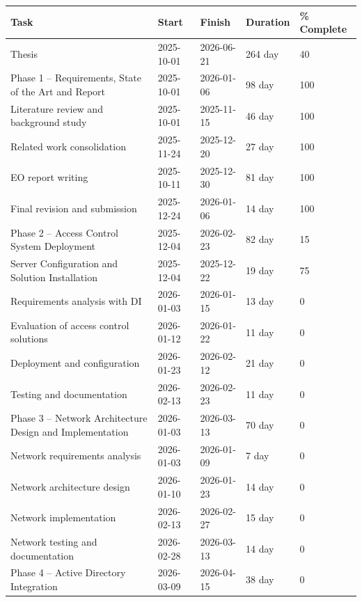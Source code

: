 \documentclass[sigplan]{acmart}
\begin{document}
\begin{table}[!ht]
    \raggedleft
    \begin{tabular}{|l|l|l|l|l|}
    \hline
        Task & Start & Finish & Duration & \% Complete \\ \hline
        Thesis & 2025-10-01 & 2026-06-21 & 264 day & 40 \\ \hline
        Phase 1 – Requirements, State of the Art and Report & 2025-10-01 & 2026-01-06 & 98 day & 100 \\ \hline
        Literature review and background study & 2025-10-01 & 2025-11-15 & 46 day & 100 \\ \hline
        Related work consolidation & 2025-11-24 & 2025-12-20 & 27 day & 100 \\ \hline
        EO report writing & 2025-10-11 & 2025-12-30 & 81 day & 100 \\ \hline
        Final revision and submission & 2025-12-24 & 2026-01-06 & 14 day & 100 \\ \hline
        Phase 2 – Access Control System Deployment & 2025-12-04 & 2026-02-23 & 82 day & 15 \\ \hline
        Server Configuration and Solution Installation & 2025-12-04 & 2025-12-22 & 19 day & 75 \\ \hline
        Requirements analysis with DI & 2026-01-03 & 2026-01-15 & 13 day & 0 \\ \hline
        Evaluation of access control solutions & 2026-01-12 & 2026-01-22 & 11 day & 0 \\ \hline
        Deployment and configuration & 2026-01-23 & 2026-02-12 & 21 day & 0 \\ \hline
        Testing and documentation & 2026-02-13 & 2026-02-23 & 11 day & 0 \\ \hline
        Phase 3 – Network Architecture Design and Implementation & 2026-01-03 & 2026-03-13 & 70 day & 0 \\ \hline
        Network requirements analysis & 2026-01-03 & 2026-01-09 & 7 day & 0 \\ \hline
        Network architecture design & 2026-01-10 & 2026-01-23 & 14 day & 0 \\ \hline
        Network implementation & 2026-02-13 & 2026-02-27 & 15 day & 0 \\ \hline
        Network testing and documentation & 2026-02-28 & 2026-03-13 & 14 day & 0 \\ \hline
        Phase 4 – Active Directory Integration & 2026-03-09 & 2026-04-15 & 38 day & 0 \\ \hline

\end{tabular}
\end{table}
\end{document}
